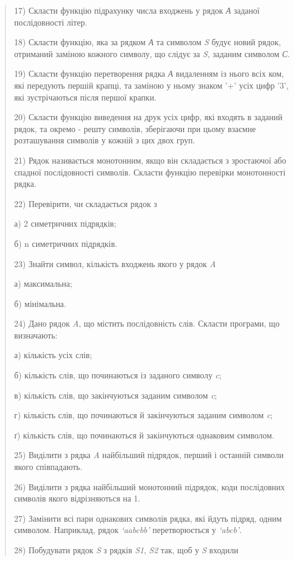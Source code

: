 \documentclass[]{article}
\begin{document}
\begin{quote}
17) Скласти функцію підрахунку числа входжень у рядок \emph{А} заданої
послідовності літер.

18) Скласти функцію, яка за рядком \emph{А} та символом \emph{S} будує
новий рядок, отриманий заміною кожного символу, що слідує за \emph{S},
заданим символом \emph{С}.

19) Скласти функцію перетворення рядка \emph{А} видаленням із нього всіх
ком, які передують першій крапці, та заміною у ньому знаком '+' усіх
цифр '3', які зустрічаються після першої крапки.

20) Скласти функцію виведення на друк усіх цифр, які входять в заданий
рядок, та окремо - решту символів, зберігаючи при цьому взаємне
розташування символів у кожній з цих двох груп.

21) Рядок називається монотонним, якщо він складається з зростаючої або
спадної послідовності символів. Скласти функцію перевірки монотонності
рядка.

22) Перевірити, чи складається рядок з

а) 2 симетричних підрядків;

б) n симетричних підрядків.

23) Знайти символ, кількість входжень якого у рядок \emph{A}

а) максимальна;

б) мінімальна.

24) Дано рядок \emph{A}, що містить послідовність слів. Скласти
програми, що визначають:

а) кількість усіх слів;

б) кількість слів, що починаються із заданого символу \emph{c};

в) кількість слів, що закінчуються заданим символом \emph{c};

г) кількість слів, що починаються й закінчуються заданим символом
\emph{c};

ґ) кількість слів, що починаються й закінчуються однаковим символом.

25) Виділити з рядка \emph{A} найбільший підрядок, перший і останній
символи якого співпадають.

26) Виділити з рядка найбільший монотонний підрядок, коди послідовних
символів якого відрізняються на 1.

27) Замінити всі пари однакових символів рядка, які йдуть підряд, одним
символом. Наприклад, рядок \emph{`aabcbb'} перетворюється у
\emph{`abcb'}.

28) Побудувати рядок \emph{S} з рядків \emph{S1}, \emph{S2} так, щоб у
\emph{S} входили


\end{quote}
\end{document}
